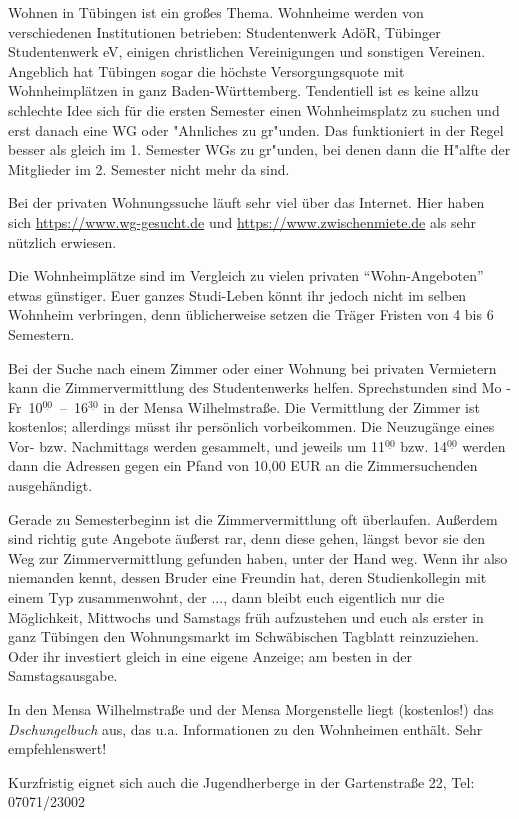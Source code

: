 Wohnen in Tübingen ist ein großes Thema.  Wohnheime werden von
  verschiedenen Institu\-tionen betrieben: Studentenwerk AdöR,
  Tübinger Studentenwerk eV, einigen christlichen Vereinigungen und
  sonstigen Vereinen.  Angeblich hat Tübingen sogar die höchste
  Versorgungsquote mit Wohnheimplätzen in ganz Baden-Württemberg.
 Tendentiell ist es keine allzu schlechte Idee sich für die ersten Semester einen Wohnheimsplatz
 zu suchen und erst danach eine WG oder  "Ahnliches zu gr"unden. Das funktioniert
 in der Regel besser als gleich im 1. Semester WGs zu gr"unden, bei denen dann die H"alfte der Mitglieder im
 2. Semester nicht mehr da sind.

Bei der privaten Wohnungssuche läuft sehr viel über das Internet. Hier haben sich \url{https://www.wg-gesucht.de} und \url{https://www.zwischenmiete.de} als sehr nützlich erwiesen.
  
Die Wohnheimplätze sind im Vergleich zu vielen privaten
  "`Wohn-Angeboten"' etwas günstiger.  Euer ganzes Studi-Leben könnt
  ihr jedoch nicht im selben Wohnheim verbringen, denn üblicherweise
  setzen die Träger Fristen von 4 bis 6 Semestern.

Bei der Suche nach einem Zimmer oder einer Wohnung bei privaten
  Vermietern kann die Zimmervermittlung des Studentenwerks helfen.
  Sprechstunden sind Mo - Fr~10$^{\underline{00}}$~--~16$^{\underline{30}}$
  in der Mensa Wilhelmstraße.  Die Vermittlung der Zimmer ist kostenlos;
  allerdings müsst ihr persönlich vorbeikommen.  
  Die Neuzugänge  eines Vor- bzw. Nachmittags werden gesammelt, und jeweils um
  11$^{\underline{00}}$ bzw. 14$^{\underline{00}}$ werden dann die
  Adressen gegen ein Pfand von 10,00 EUR an die Zimmersuchenden
  ausgehändigt.
  
Gerade zu Semesterbeginn ist die Zimmervermittlung oft überlaufen.
  Außerdem sind richtig gute Angebote äußerst rar, denn diese
  gehen, längst bevor sie den Weg zur Zimmervermittlung gefunden
  haben, unter der Hand weg.  Wenn ihr also niemanden kennt, dessen
  Bruder eine Freundin hat, deren Studienkollegin mit einem Typ
  zusammenwohnt, der ..., dann bleibt euch eigentlich nur die
  Möglichkeit, Mittwochs und Samstags früh aufzustehen und euch
  als erster in ganz Tübingen den Wohnungsmarkt im Schwäbischen
  Tagblatt reinzuziehen.  Oder ihr investiert gleich in eine eigene
  Anzeige;  am besten in der Samstagsausgabe.

In den Mensa Wilhelmstraße und der Mensa
  Morgenstelle liegt (kostenlos!) das \emph{Dschungelbuch} aus, das
  u.a. Informationen zu den Wohnheimen enthält. Sehr empfehlenswert!
\enlargethispage{1ex}

Kurzfristig eignet sich auch die Jugendherberge in der Gartenstraße 22, Tel: 07071/23002
